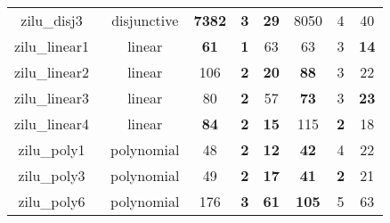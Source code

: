 \begin{table}[t]
\begin{tabular}{l c | c c c | c c c |}
\multicolumn{1}{|c|}{zilu\_disj3~\cite{zilu:repo}}				&disjunctive	&\xmark \textbf{7382} & \textbf{3} &\textbf{29}	     &8050 & 4  & 40 		  				\\
\multicolumn{1}{|c|}{zilu\_linear1~\cite{zilu:repo}}			&linear			&\textbf{61}	&\textbf{1}	&63	&63	&3	&\textbf{14}\\
\multicolumn{1}{|c|}{zilu\_linear2~\cite{zilu:repo}}			&linear			&106	&\textbf{2}	&\textbf{20}	&\textbf{88}	&3	&22\\
\multicolumn{1}{|c|}{zilu\_linear3~\cite{zilu:repo}}			&linear			&80	&\textbf{2}	&57	&\textbf{73}	&3	&\textbf{23}\\
\multicolumn{1}{|c|}{zilu\_linear4~\cite{zilu:repo}}			&linear 		&\textbf{84}	&\textbf{2}	&\textbf{15}       &115	&\textbf{2}	&18				\\
\multicolumn{1}{|c|}{zilu\_poly1~\cite{zilu:repo}}				&polynomial		&48	&\textbf{2}	&\textbf{12}	    &\textbf{42}	&4	&22				\\
\multicolumn{1}{|c|}{zilu\_poly3~\cite{zilu:repo}}				&polynomial		&49	&\textbf{2}	&\textbf{17}				               &\textbf{41} &\textbf{2}	&21	\\
\multicolumn{1}{|c|}{zilu\_poly6~\cite{zilu:repo}}				&polynomial		&176	&\textbf{3}	&\textbf{61}	&\textbf{105}	&5	&63 \\



\end{tabular}
\end{table}
